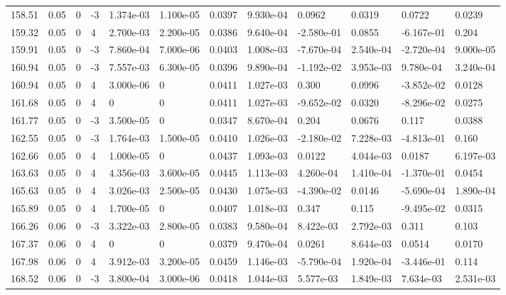 \documentclass[preview]{standalone}
\begin{document}
{{{{{{{{{\begin{tabular}{L{1.2cm}C{1.2cm} C{0.3cm}C{0.5cm} C{1.4cm}C{1.4cm} C{1.4cm}C{1.4cm} C{1.6cm}C{1.6cm} C{1.6cm}C{1.6cm}}
  158.51  &  0.05  & 0     & -3 &  1.374e-03  & 1.100e-05  &  0.0397&   9.930e-04& 0.0962 & 0.0319   &  0.0722 & 0.0239  \\ 
  159.32  &  0.05  & 0     &  4 &  2.700e-03  & 2.200e-05  &  0.0386&   9.640e-04& -2.580e-01 & 0.0855   &  -6.167e-01 & 0.204  \\ 
  159.91  &  0.05  & 0     & -3 &  7.860e-04  & 7.000e-06  &  0.0403&   1.008e-03& -7.670e-04 & 2.540e-04   &  -2.720e-04 & 9.000e-05  \\ 
  160.94  &  0.05  & 0     & -3 &  7.557e-03  & 6.300e-05  &  0.0396&   9.890e-04& -1.192e-02 & 3.953e-03   &  9.780e-04 & 3.240e-04  \\ 
  160.94  &  0.05  & 0     &  4 &  3.000e-06  & 0  &  0.0411&   1.027e-03& 0.300 & 0.0996   &  -3.852e-02 & 0.0128  \\ 
  161.68  &  0.05  & 0     &  4 &  0  & 0  &  0.0411&   1.027e-03& -9.652e-02 & 0.0320   &  -8.296e-02 & 0.0275  \\ 
  161.77  &  0.05  & 0     & -3 &  3.500e-05  & 0  &  0.0347&   8.670e-04& 0.204 & 0.0676   &  0.117 & 0.0388  \\ 
  162.55  &  0.05  & 0     & -3 &  1.764e-03  & 1.500e-05  &  0.0410&   1.026e-03& -2.180e-02 & 7.228e-03   &  -4.813e-01 & 0.160  \\ 
  162.66  &  0.05  & 0     &  4 &  1.000e-05  & 0  &  0.0437&   1.093e-03& 0.0122 & 4.044e-03   &  0.0187 & 6.197e-03  \\ 
  163.63  &  0.05  & 0     &  4 &  4.356e-03  & 3.600e-05  &  0.0445&   1.113e-03& 4.260e-04 & 1.410e-04   &  -1.370e-01 & 0.0454  \\ 
  165.63  &  0.05  & 0     &  4 &  3.026e-03  & 2.500e-05  &  0.0430&   1.075e-03& -4.390e-02 & 0.0146   &  -5.690e-04 & 1.890e-04  \\ 
  165.89  &  0.05  & 0     &  4 &  1.700e-05  & 0  &  0.0407&   1.018e-03& 0.347 & 0.115   &  -9.495e-02 & 0.0315  \\ 
  166.26  &  0.06  & 0     & -3 &  3.322e-03  & 2.800e-05  &  0.0383&   9.580e-04& 8.422e-03 & 2.792e-03   &  0.311 & 0.103  \\ 
  167.37  &  0.06  & 0     &  4 &  0  & 0  &  0.0379&   9.470e-04& 0.0261 & 8.644e-03   &  0.0514 & 0.0170  \\ 
  167.98  &  0.06  & 0     &  4 &  3.912e-03  & 3.200e-05  &  0.0459&   1.146e-03& -5.790e-04 & 1.920e-04   &  -3.446e-01 & 0.114  \\ 
  168.52  &  0.06  & 0     & -3 &  3.800e-04  & 3.000e-06  &  0.0418&   1.044e-03& 5.577e-03 & 1.849e-03   &  7.634e-03 & 2.531e-03  \\ 

\end{tabular}}}}}}}}}}
\end{document}

